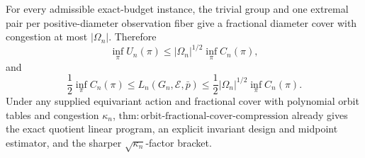 For every admissible exact-budget instance, the trivial group and one extremal pair per positive-diameter observation fiber give a fractional diameter cover with congestion at most \(|\Omega_n|\). Therefore
\[
 \inf_\pi U_n(\pi)
 \le |\Omega_n|^{1/2}\inf_\pi C_n(\pi),
\]
and
\[
 \frac12\inf_\pi C_n(\pi)
 \le L_n(G_n,\mathcal E,\bar p)
 \le \frac12|\Omega_n|^{1/2}\inf_\pi C_n(\pi).
\]
Under any supplied equivariant action and fractional cover with polynomial orbit tables and congestion \(\kappa_n\), \(\mathrm{thm{:}orbit\text{-}fractional\text{-}cover\text{-}compression}\) already gives the exact quotient linear program, an explicit invariant design and midpoint estimator, and the sharper \(\sqrt{\kappa_n}\)-factor bracket.